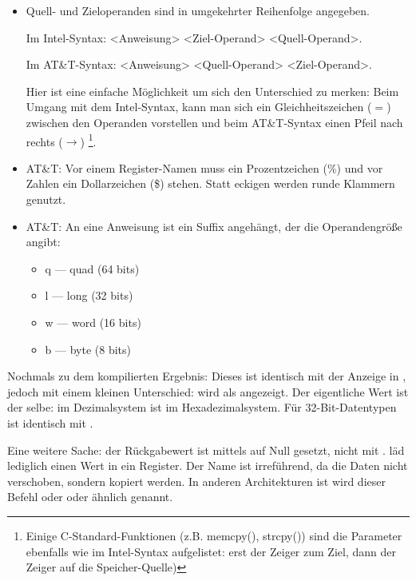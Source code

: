 \begin{itemize}

\item
Quell- und Zieloperanden sind in umgekehrter Reihenfolge angegeben.

Im Intel-Syntax: <Anweisung> <Ziel-Operand> <Quell-Operand>.

Im AT\&T-Syntax: <Anweisung> <Quell-Operand> <Ziel-Operand>.

Hier ist eine einfache Möglichkeit um sich den Unterschied zu merken:
Beim Umgang mit dem Intel-Syntax, kann man sich ein Gleichheitszeichen ($=$) zwischen den Operanden vorstellen
und beim AT\&T-Syntax einen Pfeil nach rechts ($\rightarrow$)
\footnote{Einige C-Standard-Funktionen (z.B. memcpy(), strcpy()) sind die Parameter ebenfalls wie im
Intel-Syntax aufgelistet: erst der Zeiger zum Ziel, dann der Zeiger auf die Speicher-Quelle)}.

\item
AT\&T: Vor einem Register-Namen muss ein Prozentzeichen (\%) und vor Zahlen ein Dollarzeichen (\$) stehen.
Statt eckigen werden runde Klammern genutzt.

\item
AT\&T: An eine Anweisung ist ein Suffix angehängt, der die Operandengröße angibt:

\begin{itemize}
\item q --- quad (64 bits)
\item l --- long (32 bits)
\item w --- word (16 bits)
\item b --- byte (8 bits)
\end{itemize}


\end{itemize}

Nochmals zu dem kompilierten Ergebnis: Dieses ist identisch mit der Anzeige in \IDA,
jedoch mit einem kleinen Unterschied:  wird als  angezeigt.
Der eigentliche Wert ist der selbe:  im Dezimalsystem ist  im Hexadezimalsystem.
Für 32-Bit-Datentypen ist  identisch mit .

Eine weitere Sache: der Rückgabewert ist mittels \MOV auf Null gesetzt, nicht mit \XOR.
\MOV läd lediglich einen Wert in ein Register.
Der Name ist irreführend, da die Daten nicht verschoben, sondern kopiert werden.
In anderen Architekturen ist wird dieser Befehl  oder  oder ähnlich genannt.
